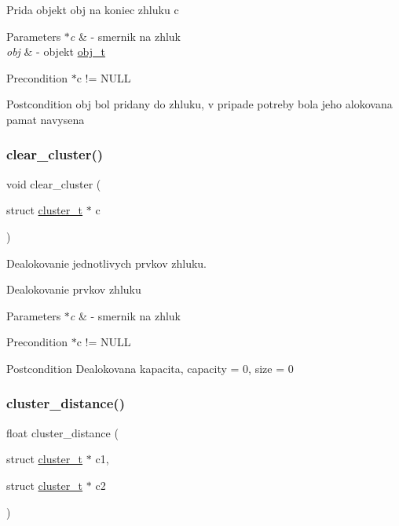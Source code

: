 Prida objekt obj na koniec zhluku c 
\begin{DoxyParams}{Parameters}
{\em $\ast$c} & -\/ smernik na zhluk \\
\hline
{\em obj} & -\/ objekt \hyperlink{structobj__t}{obj\+\_\+t} \\
\hline
\end{DoxyParams}
\begin{DoxyPrecond}{Precondition}
$\ast$c != N\+U\+LL 
\end{DoxyPrecond}
\begin{DoxyPostcond}{Postcondition}
obj bol pridany do zhluku, v pripade potreby bola jeho alokovana pamat navysena 
\end{DoxyPostcond}
\hypertarget{group___praca_ga8289f092f205baeb13cf33cfffa15324}{}\label{group___praca_ga8289f092f205baeb13cf33cfffa15324} 
\subsubsection{\texorpdfstring{clear\+\_\+cluster()}{clear\_cluster()}}
{\footnotesize\ttfamily void clear\+\_\+cluster (\begin{DoxyParamCaption}\item[{struct \hyperlink{structcluster__t}{cluster\+\_\+t} $\ast$}]{c }\end{DoxyParamCaption})}



Dealokovanie jednotlivych prvkov zhluku. 

Dealokovanie prvkov zhluku 
\begin{DoxyParams}{Parameters}
{\em $\ast$c} & -\/ smernik na zhluk \\
\hline
\end{DoxyParams}
\begin{DoxyPrecond}{Precondition}
$\ast$c != N\+U\+LL 
\end{DoxyPrecond}
\begin{DoxyPostcond}{Postcondition}
Dealokovana kapacita, capacity = 0, size = 0 
\end{DoxyPostcond}
\hypertarget{group___praca_gaf336f28a62c28da792f6def84f432bb2}{}\label{group___praca_gaf336f28a62c28da792f6def84f432bb2} 
\subsubsection{\texorpdfstring{cluster\+\_\+distance()}{cluster\_distance()}}
{\footnotesize\ttfamily float cluster\+\_\+distance (\begin{DoxyParamCaption}\item[{struct \hyperlink{structcluster__t}{cluster\+\_\+t} $\ast$}]{c1,  }\item[{struct \hyperlink{structcluster__t}{cluster\+\_\+t} $\ast$}]{c2 }\end{DoxyParamCaption})}



